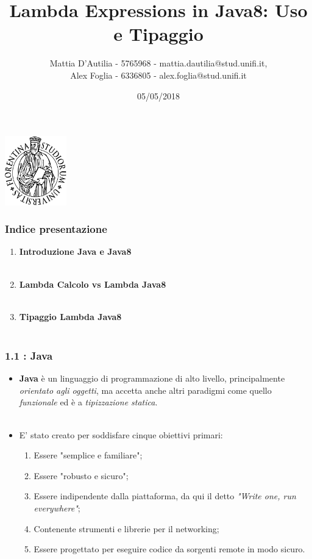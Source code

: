 \documentclass{beamer}
\title[Lambda in Java8]{Lambda Expressions in Java8: Uso e Tipaggio}
\author[]{Mattia D'Autilia - 5765968 - mattia.dautilia@stud.unifi.it,\\ Alex Foglia - 6336805 - alex.foglia@stud.unifi.it}
\date{05/05/2018}
\begin{document}
\begin{frame}
	\begin{center}
  		\includegraphics[width=0.2\textwidth]{assets/logo-unifi.png}
  	\end{center}
	\titlepage 
\end{frame}

\begin{frame}
	\frametitle{Indice presentazione}
	\begin{enumerate}
		\item
			\textbf{Introduzione Java e Java8}\\\
		\item
			\textbf{Lambda Calcolo vs Lambda Java8}\\\
		\item
			\textbf{Tipaggio Lambda Java8}\\\
	\end{enumerate}
\end{frame}


\begin{frame}
	\frametitle{\textbf{1.1 : Java}}
	\begin{itemize}
		\item
			\textbf{Java} è un linguaggio di programmazione di alto livello, principalmente \textit{orientato agli oggetti}, ma accetta anche altri paradigmi come quello \textit{funzionale} ed è a \textit{tipizzazione statica}.\\\
		\item
			E' stato creato per soddisfare cinque obiettivi primari:
			\begin{enumerate}
				\item
					Essere "semplice e familiare";
				\item
					Essere "robusto e sicuro";
				\item
					Essere indipendente dalla piattaforma, da qui il detto \textit{"Write one, run everywhere"};
				\item
					Contenente strumenti e librerie per il networking;
				\item
					Essere progettato per eseguire codice da sorgenti remote in modo sicuro.
			\end{enumerate}
	\end{itemize}
\end{frame}
\end{document}
